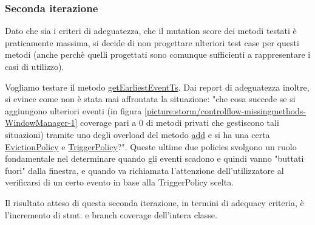 \documentclass[10pt, a4paper]{article}
\newcommand{\getpicturelabel}[1]{picture:#1}
\begin{document}
	
	\subsubsection{Seconda iterazione}
	
	Dato che sia i criteri di adeguatezza, che il mutation score dei metodi testati è praticamente massima,
	si decide di non progettare ulteriori test case per questi metodi (anche perchè quelli progettati sono
	comunque sufficienti a rappresentare i casi di utilizzo).
	
	Vogliamo testare il metodo 
	\href{https://storm.apache.org/releases/2.6.2/javadocs/org/apache/storm/windowing/WindowManager.html#getEarliestEventTs(long,long)}
	{getEarliestEventTs}.
	Dai report di adeguatezza inoltre, si evince come non è stata mai affrontata la situazione: 
	"che cosa succede se si aggiungono ulteriori eventi 
	(in figura \ref{\getpicturelabel{storm/controlflow-missingmethods-WindowManager-1}} coverage pari a 0 di
	metodi privati che gestiscono tali situazioni) tramite uno degli
	overload del metodo 
	\href{https://storm.apache.org/releases/2.6.2/javadocs/org/apache/storm/windowing/WindowManager.html#add(T)}
	{add} e si ha una certa 
	\href{https://storm.apache.org/releases/2.6.2/javadocs/org/apache/storm/windowing/EvictionPolicy.html}
	{EvictionPolicy} e 
	\href{https://storm.apache.org/releases/2.6.2/javadocs/org/apache/storm/windowing/TriggerPolicy.html}
	{TriggerPolicy}?". Queste ultime due policies 
	svolgono un ruolo fondamentale nel determinare quando gli eventi scadono e quindi vanno
	"buttati fuori" dalla finestra, e quando va richiamata l'attenzione dell'utilizzatore al verificarsi di
	un certo evento in base alla TriggerPolicy scelta.
	
	Il risultato atteso di questa seconda iterazione, in termini di adequacy criteria, 
	è l'incremento di stmt. e branch coverage dell'intera classe.
	
\end{document}
